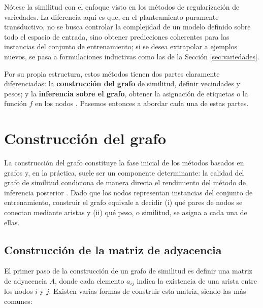 \begin{rema}
    Nótese la similitud con el enfoque visto en los métodos de regularización de variedades. La diferencia aquí es que, en el planteamiento puramente transductivo, no se busca controlar la complejidad de un modelo definido sobre todo el espacio de entrada, sino obtener predicciones coherentes para las instancias del conjunto de entrenamiento; si se desea extrapolar a ejemplos nuevos, se pasa a formulaciones inductivas como las de la Sección \ref{sec:variedades}.
\end{rema}

Por su propia estructura, estos métodos tienen dos partes claramente diferenciadas: la \textbf{construcción del grafo} de similitud, definir vecindades y pesos; y la \textbf{inferencia sobre el grafo}, obtener la asignación de etiquetas o la función $f$ en los nodos \cite{van2020survey}. Pasemos entonces a abordar cada una de estas partes.

\section{Construcción del grafo}

La construcción del grafo constituye la fase inicial de los métodos basados en grafos y, en la práctica, suele ser un componente determinante: la calidad del grafo de similitud condiciona de manera directa el rendimiento del método de inferencia posterior \cite{van2020survey}. Dado que los nodos representan instancias del conjunto de entrenamiento, construir el grafo equivale a decidir (i) qué pares de nodos se conectan mediante aristas y (ii) qué peso, o similitud, se asigna a cada una de ellas.

\subsection{Construcción de la matriz de adyacencia}

El primer paso de la construcción de un grafo de similitud es definir una matriz de adyacencia $A$, donde cada elemento $a_{ij}$ indica la existencia de una arista entre los nodos $i$ y $j$. Existen varias formas de construir esta matriz, siendo las más comunes:


